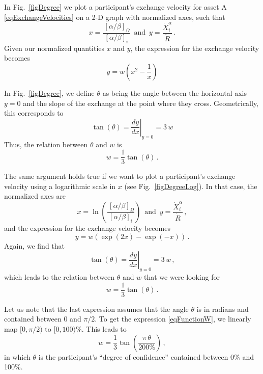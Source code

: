 \documentclass[letterpaper]{article}
\newcommand{\priceAB}{\left[\alpha / \beta\right]}
\begin{document}
In Fig.~\ref{figDegree} we plot a participant's exchange velocity for asset A \eqref{eqExchangeVelocities} on a 2-D graph with normalized axes, such that
\begin{equation*}
    x = \frac{\hspace{2pt}\priceAB_\Omega}{\priceAB_i}\,\text{ and }\,
    y = \frac{\dot{X}_i^\alpha}{\dot{R}} \,.
\end{equation*}
Given our normalized quantities $x$ and $y$, the expression for the exchange velocity becomes
\begin{equation*}
    y = w \left(x^2 - \frac{1}{x}\right)
\end{equation*}

In Fig.~\ref{figDegree}, we define $\theta$ as being the angle between the horizontal axis $y=0$ and the slope of the exchange at the point where they cross. Geometrically, this corresponds to
\begin{equation*}
    \tan \left( \theta \right) = \left.\frac{dy}{dx}\right|_{y=0} = 3\, w
\end{equation*}
Thus, the relation between $\theta$ and $w$ is
\begin{equation*}
    w = \frac{1}{3}\tan \left(\theta\right)\,.
\end{equation*}

The same argument holds true if we want to plot a participant's exchange velocity using a logarithmic scale in $x$ (see Fig.~\ref{figDegreeLog}). In that case, the normalized axes are
\begin{equation*}
    x = \ln\!\left(\frac{\hspace{2pt}\priceAB_\Omega}{\priceAB_i}\right) \,\text{ and }\,
    y = \frac{\dot{X}_i^\alpha}{\dot{R}}\,,
\end{equation*}
and the expression for the exchange velocity becomes
\begin{equation*}
    y = w \left(\exp(2x) - \exp(-x)\right) \, .
\end{equation*}
Again, we find that
\begin{equation*}
    \tan \left( \theta \right) = \left.\frac{dy}{dx}\right|_{y=0} = 3\, w \,,
\end{equation*}
which leads to the relation between $\theta$ and $w$ that we were looking for
\begin{equation*}
    w = \frac{1}{3}\tan \left(\theta\right)\,.
\end{equation*}

Let us note that the last expression assumes that the angle $\theta$ is in radians and contained between 0 and $\pi/2$. To get the expression \eqref{eqFunctionW}, we linearly map $[0,\pi/2)$ to $[0,100)\%$. This leads to
\begin{equation*}
    w = \frac{1}{3}\tan \left(\frac{\pi\, \theta}{200\%}\right)\,,
\end{equation*}
in which $\theta$ is the participant's ``degree of confidence'' contained between 0\% and 100\%.
\end{document}
